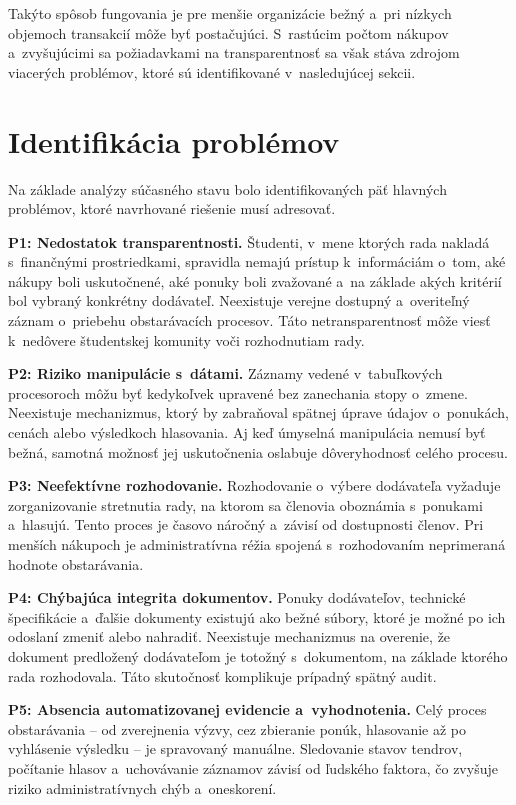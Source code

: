 Takýto spôsob fungovania je pre menšie organizácie bežný a~pri
nízkych objemoch transakcií môže byť postačujúci. S~rastúcim počtom
nákupov a~zvyšujúcimi sa požiadavkami na transparentnosť sa však
stáva zdrojom viacerých problémov, ktoré sú identifikované
v~nasledujúcej sekcii.

\section{Identifikácia problémov}
\label{sec:problem_identification}

Na základe analýzy súčasného stavu bolo identifikovaných päť hlavných
problémov, ktoré navrhované riešenie musí adresovať.

\textbf{P1: Nedostatok transparentnosti.}
Študenti, v~mene ktorých rada nakladá s~finančnými prostriedkami,
spravidla nemajú prístup k~informáciám o~tom, aké nákupy boli
uskutočnené, aké ponuky boli zvažované a~na základe akých kritérií
bol vybraný konkrétny dodávateľ. Neexistuje verejne dostupný
a~overiteľný záznam o~priebehu obstarávacích procesov. Táto
netransparentnosť môže viesť k~nedôvere študentskej komunity voči
rozhodnutiam rady.

\textbf{P2: Riziko manipulácie s~dátami.}
Záznamy vedené v~tabuľkových procesoroch môžu byť kedykoľvek
upravené bez zanechania stopy o~zmene. Neexistuje mechanizmus, ktorý
by zabraňoval spätnej úprave údajov o~ponukách, cenách alebo
výsledkoch hlasovania. Aj keď úmyselná manipulácia nemusí byť
bežná, samotná možnosť jej uskutočnenia oslabuje dôveryhodnosť
celého procesu.

\textbf{P3: Neefektívne rozhodovanie.}
Rozhodovanie o~výbere dodávateľa vyžaduje zorganizovanie stretnutia
rady, na ktorom sa členovia oboznámia s~ponukami a~hlasujú. Tento
proces je časovo náročný a~závisí od dostupnosti členov. Pri menších
nákupoch je administratívna réžia spojená s~rozhodovaním
neprimeraná hodnote obstarávania.

\textbf{P4: Chýbajúca integrita dokumentov.}
Ponuky dodávateľov, technické špecifikácie a~ďalšie dokumenty
existujú ako bežné súbory, ktoré je možné po ich odoslaní zmeniť
alebo nahradiť. Neexistuje mechanizmus na overenie, že dokument
predložený dodávateľom je totožný s~dokumentom, na základe ktorého
rada rozhodovala. Táto skutočnosť komplikuje prípadný spätný audit.

\textbf{P5: Absencia automatizovanej evidencie a~vyhodnotenia.}
Celý proces obstarávania -- od zverejnenia výzvy, cez zbieranie
ponúk, hlasovanie až po vyhlásenie výsledku -- je spravovaný
manuálne. Sledovanie stavov tendrov, počítanie hlasov a~uchovávanie
záznamov závisí od ľudského faktora, čo zvyšuje riziko
administratívnych chýb a~oneskorení.

